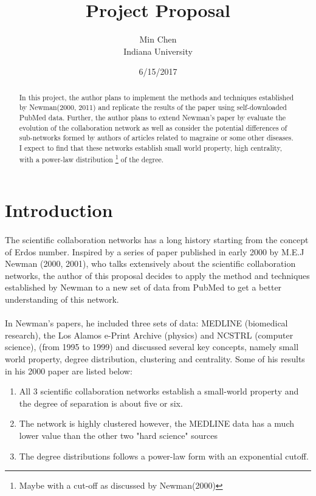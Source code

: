 \documentclass[12pt]{article}
\makeatletter
\def\s@btitle{\relax}
\def\subtitle#1{\gdef\s@btitle{#1}}
\makeatother
\begin{document}
\title{Project Proposal}
\subtitle{Revisit The Structure of Scientific Collaboration Networks Using PubMed Data}
\author{Min Chen\\Indiana University}
\date{6/15/2017}
\maketitle
\bigskip
\begin{abstract}
In this project, the author plans to implement the methods and techniques established by Newman(2000, 2011) and replicate the results of the paper using self-downloaded PubMed data. Further, the author plans to extend Newman's paper by evaluate the evolution of the collaboration network as well as consider the potential differences of sub-networks formed by authors of articles related to magraine or some other diseases. I expect to find that these networks establish small world property, high centrality, with a power-law distribution \footnote{Maybe with a cut-off as discussed by Newman(2000)} of the degree. 
\end{abstract}
\pagebreak
\tableofcontents
\pagebreak

\section{Introduction}
\paragraph{}
The scientific collaboration networks has a long history starting from the concept of Erdos number. Inspired by a series of paper published in early 2000 by M.E.J Newman (2000, 2001), who talks extensively about the scientific collaboration networks, the author of this proposal decides to apply the method and techniques established by Newman to a new set of data from PubMed to get a better understanding of this network.
\paragraph{}
In Newman's papers, he included three sets of data: MEDLINE (biomedical research), the Los Alamos e-Print Archive (physics) and NCSTRL (computer science), (from 1995 to 1999) and discussed several key concepts, namely small world property, degree distribution, clustering and centrality. Some of his results in his 2000 paper are listed below:
\begin{enumerate}
	\item All 3 scientific collaboration networks establish a small-world property and the degree of separation is about five or six.
	\item The network is highly clustered however, the MEDLINE data has a much lower value than the other two "hard science" sources
	\item The degree distributions follows a power-law form with an exponential cutoff. 
\end{enumerate}
\end{document}
